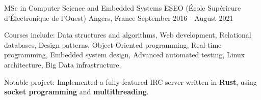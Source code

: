

\begin{cventries}

  \cventry
    {MSc in Computer Science and Embedded Systems} %
    {ESEO (École Supérieure d'Électronique de l'Ouest)} %
    {Angers, France} %
    {September 2016 - August 2021} %
    {
      \begin{cvitems} %
        \item {Courses include: Data structures and algorithms, Web development, Relational databases, Design patterns, Object-Oriented programming, Real-time programming, Embedded system design, Advanced automated testing, Linux architecture, Big Data infrastructure.}
        \item {Notable project: Implemented a fully-featured IRC server written in \textbf{Rust}, using \textbf{socket programming} and \textbf{multithreading}.}
      \end{cvitems}
    }

\end{cventries}

